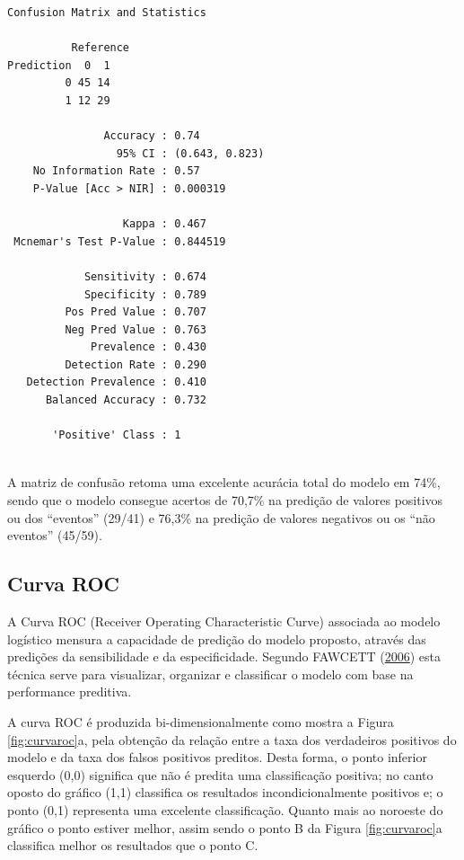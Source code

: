 \documentclass[12pt,brazil,oneside]{book}
\begin{document}
\begin{verbatim}
Confusion Matrix and Statistics

          Reference
Prediction  0  1
         0 45 14
         1 12 29
                                        
               Accuracy : 0.74          
                 95% CI : (0.643, 0.823)
    No Information Rate : 0.57          
    P-Value [Acc > NIR] : 0.000319      
                                        
                  Kappa : 0.467         
 Mcnemar's Test P-Value : 0.844519      
                                        
            Sensitivity : 0.674         
            Specificity : 0.789         
         Pos Pred Value : 0.707         
         Neg Pred Value : 0.763         
             Prevalence : 0.430         
         Detection Rate : 0.290         
   Detection Prevalence : 0.410         
      Balanced Accuracy : 0.732         
                                        
       'Positive' Class : 1             
                                        
\end{verbatim}

A matriz de confusão retoma uma excelente acurácia total do modelo em
74\%, sendo que o modelo consegue acertos de 70,7\% na predição de
valores positivos ou dos ``eventos'' (29/41) e 76,3\% na predição de
valores negativos ou os ``não eventos'' (45/59).

\hypertarget{curva-roc}{%
\subsection{Curva ROC}\label{curva-roc}}

A Curva ROC (Receiver Operating Characteristic Curve) associada ao
modelo logístico mensura a capacidade de predição do modelo proposto,
através das predições da sensibilidade e da especificidade. Segundo
FAWCETT (\protect\hyperlink{ref-Fawcett2006}{2006}) esta técnica serve
para visualizar, organizar e classificar o modelo com base na
performance preditiva.

A curva ROC é produzida bi-dimensionalmente como mostra a Figura
\ref{fig:curvaroc}a, pela obtenção da relação entre a taxa dos
verdadeiros positivos do modelo e da taxa dos falsos positivos preditos.
Desta forma, o ponto inferior esquerdo (0,0) significa que não é predita
uma classificação positiva; no canto oposto do gráfico (1,1) classifica
os resultados incondicionalmente positivos e; o ponto (0,1) representa
uma excelente classificação. Quanto mais ao noroeste do gráfico o ponto
estiver melhor, assim sendo o ponto B da Figura \ref{fig:curvaroc}a
classifica melhor os resultados que o ponto C.
\end{document}
